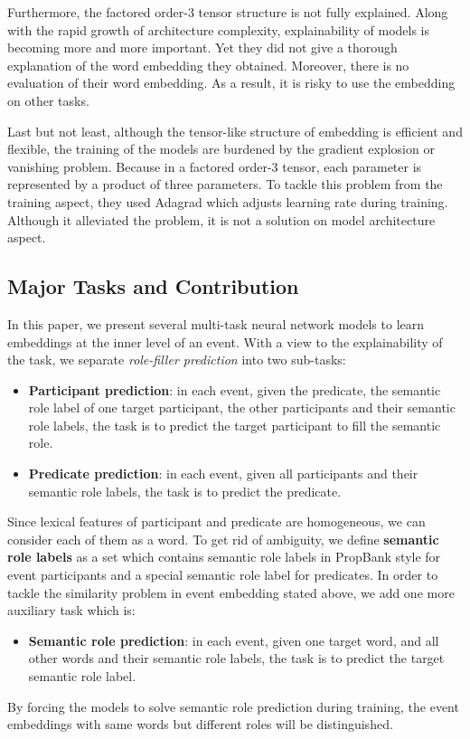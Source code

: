 \documentclass[a4paper]{article}
\begin{document}
Furthermore, the factored order-3 tensor structure is not fully explained. Along with the rapid growth of architecture complexity, explainability of models is becoming more and more important. Yet they did not give a thorough explanation of the word embedding they obtained. Moreover, there is no evaluation of their word embedding. As a result, it is risky to use the embedding on other tasks. 

Last but not least, although the tensor-like structure of embedding is efficient and flexible, the training of the models are burdened by the gradient explosion or vanishing problem. Because in a factored order-3 tensor, each parameter is represented by a product of three parameters. To tackle this problem from the training aspect, they used Adagrad \citep{duchi2011adaptive} which adjusts learning rate during training. Although it alleviated the problem, it is not a solution on model architecture aspect. 


\subsection{Major Tasks and Contribution}
In this paper, we present several multi-task neural network models to learn embeddings at the inner level of an event. With a view to the explainability of the task, we separate \textit{role-filler prediction} into two sub-tasks: 
\begin{itemize}
  \item  \textbf{Participant prediction}: in each event, given the predicate, the semantic role label of one target participant, the other participants and their semantic role labels, the task is to predict the target participant to fill the semantic role. 
  \item  \textbf{Predicate prediction}: in each event, given all participants and their semantic role labels, the task is to predict the predicate. 
\end{itemize}
Since lexical features of participant and predicate are homogeneous, we can consider each of them as a word. To get rid of ambiguity, we define \textbf{semantic role labels} as a set which contains semantic role labels in PropBank style for event participants and a special semantic role label for predicates. In order to tackle the similarity problem in event embedding stated above, we add one more auxiliary task which is: 
\begin{itemize}
  \item  \textbf{Semantic role prediction}: in each event, given one target word, and all other words and their semantic role labels, the task is to predict the target semantic role label. 
\end{itemize}
By forcing the models to solve semantic role prediction during training, the event embeddings with same words but different roles will be distinguished. 
\end{document}
